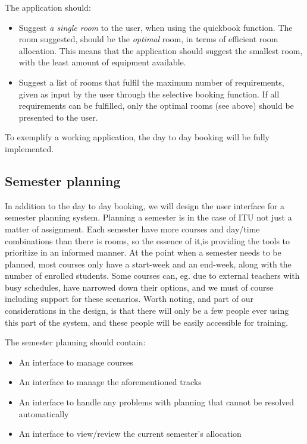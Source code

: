 The application should:

\begin{itemize}
	\item Suggest \emph{a single room} to the user, when using the quickbook function. The room suggested, should be the \emph{optimal} room, in terms of efficient room allocation. This means that the application should suggest the smallest room, with the least amount of equipment available.
	\item Suggest a list of rooms that fulfil the maximum number of requirements, given as input by the user through the selective booking function. If all requirements can be fulfilled, only the optimal rooms (see above) should be presented to the user.
\end{itemize}

To exemplify a working application, the day to day booking will be fully implemented.

\subsection{Semester planning}
In addition to the day to day booking, we will design the user interface for a semester planning system. Planning a semester is in the case of ITU not just a matter of assignment. Each semester have more courses and day/time combinations than there is rooms, so the essence of it,is providing the tools to prioritize in an informed manner. At the point when a semester needs to be planned, most courses only have a start-week and an end-week, along with the number of enrolled students. Some courses can, eg. due to external teachers with busy schedules, have narrowed down their options, and we must of course including support for these scenarios.
Worth noting, and part of our considerations in the design, is that there will only be a few people ever using this part of the system, and these people will be easily accessible for training.

The semester planning should contain:

\begin{itemize}
	\item An interface to manage courses
	\item An interface to manage the aforementioned tracks
	\item An interface to handle any problems with planning that cannot be resolved automatically
	\item An interface to view/review the current semester's allocation
\end{itemize}

